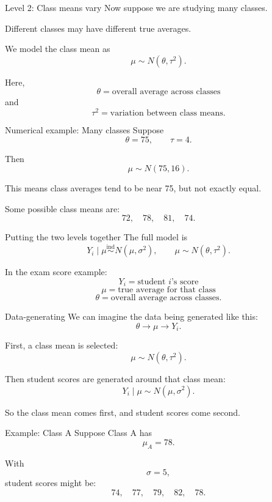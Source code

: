 \documentclass[aspectratio=43,11pt]{beamer}
\begin{document}
{\begin{frame}{Level 2: Class means vary}
Now suppose we are studying many classes.

\medskip
Different classes may have different true averages.

\medskip
We model the class mean as
\[
\mu \sim N(\theta,\tau^2).
\]

Here,
\[
\theta = \text{overall average across classes}
\]
and
\[
\tau^2 = \text{variation between class means}.
\]
\end{frame}

\begin{frame}{Numerical example: Many classes}
Suppose
\[
\theta = 75,
\qquad
\tau = 4.
\]

Then
\[
\mu \sim N(75,16).
\]

\medskip
This means class averages tend to be near 75, but not exactly equal.

\medskip
Some possible class means are:
\[
72,\quad 78,\quad 81,\quad 74.
\]
\end{frame}

\begin{frame}{Putting the two levels together}
The full model is
\[
Y_i \mid \mu \overset{\text{ind}}{\sim} N(\mu,\sigma^2),
\qquad
\mu \sim N(\theta,\tau^2).
\]

In the exam score example:
\[
Y_i = \text{student } i\text{'s score}
\]
\[
\mu = \text{true average for that class}
\]
\[
\theta = \text{overall average across classes}.
\]
\end{frame}

\begin{frame}{Data-generating}
We can imagine the data being generated like this:
\[
\theta \longrightarrow \mu \longrightarrow Y_i.
\]

First, a class mean is selected:
\[
\mu \sim N(\theta,\tau^2).
\]

Then student scores are generated around that class mean:
\[
Y_i \mid \mu \sim N(\mu,\sigma^2).
\]

So the class mean comes first, and student scores come second.
\end{frame}

\begin{frame}{Example: Class A}
Suppose Class A has
\[
\mu_A = 78.
\]

With
\[
\sigma = 5,
\]
student scores might be:
\[
74,\quad 77,\quad 79,\quad 82,\quad 78.
\]


\end{frame}}
\end{document}
